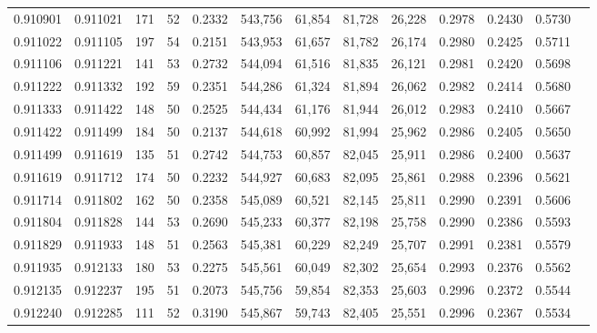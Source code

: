 \begin{tabular}{rrrrrrrrrrrrr}
0.910901 & 0.911021 &   171 &  52 &                                     0.2332 & 543,756 &  61,854 &  81,728 &  26,228 & 0.2978 & 0.2430 & 0.5730 \\
0.911022 & 0.911105 &   197 &  54 &                                     0.2151 & 543,953 &  61,657 &  81,782 &  26,174 & 0.2980 & 0.2425 & 0.5711 \\
0.911106 & 0.911221 &   141 &  53 &                                     0.2732 & 544,094 &  61,516 &  81,835 &  26,121 & 0.2981 & 0.2420 & 0.5698 \\
0.911222 & 0.911332 &   192 &  59 &                                     0.2351 & 544,286 &  61,324 &  81,894 &  26,062 & 0.2982 & 0.2414 & 0.5680 \\
0.911333 & 0.911422 &   148 &  50 &                                     0.2525 & 544,434 &  61,176 &  81,944 &  26,012 & 0.2983 & 0.2410 & 0.5667 \\
0.911422 & 0.911499 &   184 &  50 &                                     0.2137 & 544,618 &  60,992 &  81,994 &  25,962 & 0.2986 & 0.2405 & 0.5650 \\
0.911499 & 0.911619 &   135 &  51 &                                     0.2742 & 544,753 &  60,857 &  82,045 &  25,911 & 0.2986 & 0.2400 & 0.5637 \\
0.911619 & 0.911712 &   174 &  50 &                                     0.2232 & 544,927 &  60,683 &  82,095 &  25,861 & 0.2988 & 0.2396 & 0.5621 \\
0.911714 & 0.911802 &   162 &  50 &                                     0.2358 & 545,089 &  60,521 &  82,145 &  25,811 & 0.2990 & 0.2391 & 0.5606 \\
0.911804 & 0.911828 &   144 &  53 &                                     0.2690 & 545,233 &  60,377 &  82,198 &  25,758 & 0.2990 & 0.2386 & 0.5593 \\
0.911829 & 0.911933 &   148 &  51 &                                     0.2563 & 545,381 &  60,229 &  82,249 &  25,707 & 0.2991 & 0.2381 & 0.5579 \\
0.911935 & 0.912133 &   180 &  53 &                                     0.2275 & 545,561 &  60,049 &  82,302 &  25,654 & 0.2993 & 0.2376 & 0.5562 \\
0.912135 & 0.912237 &   195 &  51 &                                     0.2073 & 545,756 &  59,854 &  82,353 &  25,603 & 0.2996 & 0.2372 & 0.5544 \\
0.912240 & 0.912285 &   111 &  52 &                                     0.3190 & 545,867 &  59,743 &  82,405 &  25,551 & 0.2996 & 0.2367 & 0.5534 \\

\end{tabular}
